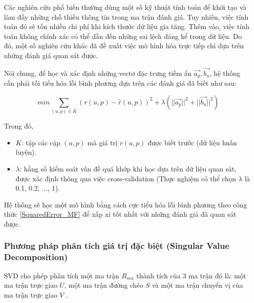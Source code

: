 Các nghiên cứu phổ biến thường dùng một số kỹ thuật tính toán để khởi tạo và làm đầy những chỗ thiếu thông tin trong ma trận đánh giá. Tuy nhiên, việc tính toán đó sẽ tốn nhiều chi phí khi kích thước dữ liệu gia tăng. Thêm vào, việc tính toán không chính xác có thể dẫn đến những sai lệch đáng kể trong dữ liệu. Do đó, một số nghiên cứu khác đã đề xuất việc mô hình hóa trực tiếp chỉ dựa trên những đánh giá quan sát được.

Nói chung, để học và xác định những vectơ đặc trưng tiềm ẩn $\overrightarrow{a_{p}}, \overrightarrow{b_{u}}$, hệ thống cần phải tối tiểu hóa lỗi bình phương dựa trên các đánh giá đã biết như sau:

\begin{equation}\label{SquaredError_MF}
min \sum\limits_{(u,p) \in K}^{}(r(u,p) - \hat{r}(u,p))^2 + \lambda(||\overrightarrow{a_{p}}||^2 + ||\overrightarrow{b_{u}}||^2)
\end{equation}

Trong đó,
\begin{itemize}
\item $K$: tập các cặp $(u,p)$ mà giá trị $r(u,p)$ được biết trước (dữ liệu huấn luyện).
\item $\lambda$: hằng số kiểm soát vấn đề quá khớp khi học dựa trên dữ liệu quan sát, được xác định thông qua việc cross-validation (Thực nghiệm có thể chọn $\lambda$ là 0.1, 0.2, ..., 1).
\end{itemize}

Hệ thống sẽ học một mô hình bằng cách cực tiểu hóa lỗi bình phương theo công thức \ref{SquaredError_MF} để xấp xỉ tốt nhất với những đánh giá đã quan sát được.
\subsubsection*{Phương pháp phân tích giá trị đặc biệt (Singular Value Decomposition)} 
SVD cho phép phân tích một ma trận $R_{mn}$ thành tích của 3 ma trận đó là: một ma trận trực giao $U$, một ma trận đường chéo $S$ và một ma trận chuyển vị của ma trận trực giao $V$ \cite{kb2005}.


